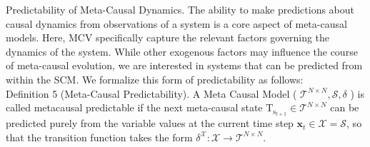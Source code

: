 \documentclass[10pt]{article}
\begin{document}
Predictability of Meta-Causal Dynamics. The ability to make predictions about causal dynamics from observations of a system is a core aspect of meta-causal models. Here, MCV specifically capture the relevant factors governing the dynamics of the system. While other exogenous factors may influence the course of meta-causal evolution, we are interested in systems that can be predicted from within the SCM. We formalize this form of predictability as follows:\\
Definition 5 (Meta-Causal Predictability). A Meta Causal Model ( $\mathcal{T}^{N \times N}, \mathcal{S}, \delta$ ) is called metacausal predictable if the next meta-causal state $\mathrm{T}_{\mathrm{s}_{t+1}} \in \mathcal{T}^{N \times N}$ can be predicted purely from the variable values at the current time step $\boldsymbol{x}_{t} \in \boldsymbol{\mathcal { X }}=\mathcal{S}$, so that the transition function takes the form $\delta^{\mathcal{X}}: \mathcal{X} \rightarrow \mathcal{T}^{N \times N}$.
\end{document}
